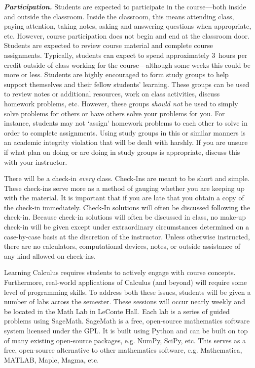 \documentclass[11pt,letterpaper]{article}
\begin{document}
{\itshape\bfseries\color{scred}Participation.} Students are expected to participate in the course---both inside and outside the classroom. Inside the classroom, this means attending class, paying attention, taking notes, asking and answering questions when appropriate, etc. However, course participation does not begin and end at the classroom door. Students are expected to review course material and complete course assignments. Typically, students can expect to spend approximately 3~hours per credit outside of class working for the course---although some weeks this could be more or less. Students are highly encouraged to form study groups to help support themselves and their fellow students' learning. These groups can be used to review notes or additional resources, work on class activities, discuss homework problems, etc. However, these groups {\itshape should not} be used to simply solve problems for others or have others solve your problems for you. For instance, students may not `assign' homework problems to each other to solve in order to complete assignments. Using study groups in this or similar manners is an academic integrity violation that will be dealt with harshly. If you are unsure if what plan on doing or are doing in study groups is appropriate, discuss this with your instructor. \sectionbreak




There will be a check-in \textit{every} class. Check-Ins are meant to be short and simple. These check-ins serve more as a method of gauging whether you are keeping up with the material. It is important that if you are late that you obtain a copy of the check-in immediately. Check-In solutions will often be discussed following the check-in. Because check-in solutions will often be discussed in class, no make-up check-in will be given except under extraordinary circumstances determined on a case-by-case basis at the discretion of the instructor. Unless otherwise instructed, there are no calculators, computational devices, notes, or outside assistance of any kind allowed on check-ins. 
\sectionbreak



Learning Calculus requires students to actively engage with course concepts. Furthermore, real-world applications of Calculus (and beyond) will require some level of programming skills. To address both these issues, students will be given a number of labs across the semester. These sessions will occur nearly weekly and be located in the Math Lab in LeConte Hall. Each lab is a series of guided problems using SageMath. SageMath is a free, open-source mathematics software system licensed under the GPL. It is built using Python and can be built on top of many existing open-source packages, e.g. NumPy, SciPy, etc. This serves as a free, open-source alternative to other mathematics software, e.g. Mathematica, MATLAB, Maple, Magma, etc. \pspace
\end{document}
